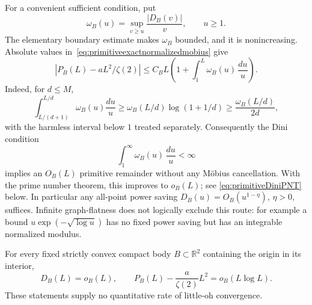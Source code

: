 For a convenient sufficient condition, put
\[
 \omega_B(u)=\sup_{v\ge u}\frac{|D_B(v)|}{v},\qquad u\ge1.
\]
The elementary boundary estimate makes $\omega_B$ bounded, and it is
nonincreasing. Absolute values in~\eqref{eq:primitiveexactnormalizedmobius}
give
\begin{equation}
 |P_B(L)-aL^2/\zeta(2)|
 \le C_B L\left(1+\int_1^L\omega_B(u)\,\frac{du}{u}\right).
 \label{eq:primitiveDini}
\end{equation}
Indeed, for $d\le M$,
\[
 \int_{L/(d+1)}^{L/d}\omega_B(u)\frac{du}{u}
 \ge\omega_B(L/d)\log(1+1/d)
 \ge\frac{\omega_B(L/d)}{2d},
\]
with the harmless interval below $1$ treated separately.
Consequently the Dini condition
\[
 \int_1^\infty\omega_B(u)\,\frac{du}{u}<\infty
\]
implies an $O_B(L)$ primitive remainder without any M\"obius cancellation.
With the prime number theorem, this improves to $o_B(L)$; see
\eqref{eq:primitiveDiniPNT} below.
In particular any all-point power saving $D_B(u)=O_B(u^{1-\eta})$,
$\eta>0$, suffices. Infinite graph-flatness does not logically exclude
this route: for example a bound $u\exp(-\sqrt{\log u})$ has no fixed
power saving but has an integrable normalized modulus.

\begin{proposition}
\label{prop:strictconvexlittleo}
For every fixed strictly convex compact body $B\subset\mathbb R^2$
containing the origin in its interior,
\[
 D_B(L)=o_B(L),\qquad
 P_B(L)-\frac{a}{\zeta(2)}L^2=o_B(L\log L).
\]
These statements supply no quantitative rate of little-oh convergence.
\end{proposition}

